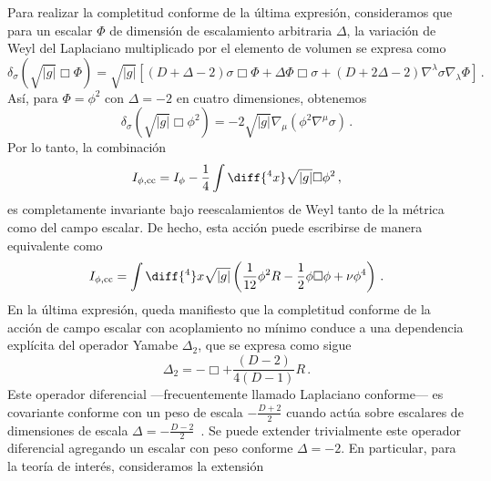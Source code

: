 \documentclass[../Main.tex]{subfiles}
\begin{document}
Para realizar la completitud conforme de la última expresión, consideramos que para un escalar $\Phi$ de dimensión de escalamiento arbitraria $\Delta$, la variación de Weyl del Laplaciano multiplicado por el elemento de volumen se expresa como
\begin{equation}
\delta_{\sigma}\left(\sqrt{|g|} \Box \Phi \right) =  \sqrt{|g|} \left[\left(D+\Delta-2\right) \sigma \Box \Phi +\Delta \Phi \Box \sigma + \left(D+2\Delta-2\right) \nabla^{\lambda} \sigma \nabla_{\lambda} \Phi \right] \,.
\end{equation}
Así, para $\Phi = \phi^2$ con $\Delta=-2$ en cuatro dimensiones, obtenemos
\begin{equation}
\delta_{\sigma}\left(\sqrt{|g|} \Box \phi^2 \right) = -2 \sqrt{|g|} \nabla_{\mu} \left(\phi^{2} \nabla^{\mu} \sigma \right) \,.
\end{equation}
Por lo tanto, la combinación 
\begin{equation}
I_{\phi,\rm cc}=I_{\phi} - \frac{1}{4}\int\diff{^4x}\sqrt{|g|} \Box \phi^2 \,,
\end{equation}
es completamente invariante bajo reescalamientos de Weyl tanto de la métrica como del campo escalar. De hecho, esta acción puede escribirse de manera equivalente como
\begin{equation}
I_{\phi,\rm cc}=\int\diff{^4}x\sqrt{|g|}\left(\frac{1}{12}\phi^2 R - \frac{1}{2}\phi\Box\phi + \nu\phi^4\right) \,.
\label{Ibulkconf}
\end{equation}
En la última expresión, queda manifiesto que la completitud conforme de la acción de campo escalar con acoplamiento no mínimo conduce a una dependencia explícita del operador Yamabe $\Delta_2$, que se expresa como sigue
\begin{equation}\label{Yamabe}
\Delta_2 = - \Box+ \frac{\left(D-2\right)}{4\left(D-1\right)} R\,.
\end{equation}
Este operador diferencial ---frecuentemente llamado Laplaciano conforme--- es covariante conforme con un peso de escala $-\frac{D+2}{2}$ cuando actúa sobre escalares de dimensiones de escala $\Delta = -\frac{D-2}{2}$~\cite{Osborn:2015rna, Gover:2002ay}. Se puede extender trivialmente este operador diferencial agregando un escalar con peso conforme $\Delta=-2$. En particular, para la teoría de interés, consideramos la extensión
\end{document}
